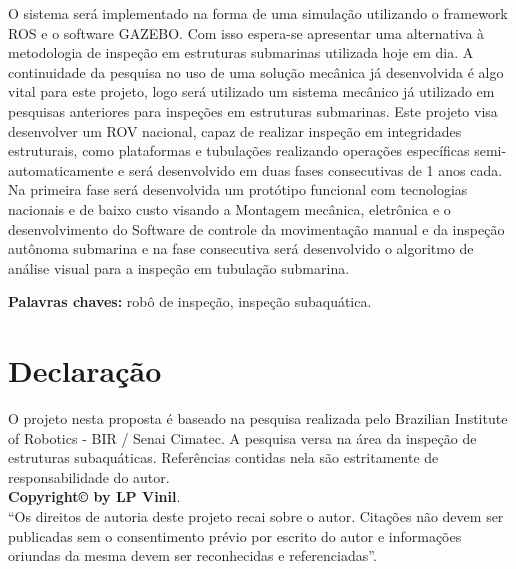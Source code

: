 O sistema será implementado na forma de uma simulação utilizando o framework ROS e o software GAZEBO. Com isso espera-se apresentar uma alternativa à metodologia de inspeção em estruturas submarinas utilizada hoje em dia. A continuidade da pesquisa no uso de uma solução mecânica já desenvolvida é algo vital para este projeto, logo será utilizado um sistema mecânico já utilizado em pesquisas anteriores para inspeções em estruturas submarinas.
Este projeto visa desenvolver um ROV nacional, capaz de realizar inspeção em integridades estruturais, como plataformas e tubulações realizando operações específicas semi-automaticamente e será desenvolvido em duas fases consecutivas de 1 anos cada. Na primeira fase será desenvolvida um protótipo funcional com tecnologias nacionais e de baixo custo visando a Montagem mecânica, eletrônica e o desenvolvimento do Software de controle da movimentação manual e da inspeção autônoma submarina e na fase consecutiva será desenvolvido o algoritmo de análise visual para a inspeção em tubulação submarina.

 

\vspace*{1cm}
\noindent \textbf{Palavras chaves: }robô de inspeção, inspeção subaquática.


\chapter*{Declaração}
O projeto nesta proposta é baseado na pesquisa realizada pelo Brazilian Institute of Robotics - BIR / Senai Cimatec. A pesquisa versa na área da inspeção de estruturas subaquáticas. Referências contidas nela são estritamente de responsabilidade do autor.\\
\vspace*{8cm}
\vfill
\noindent \textbf{Copyright\copyright{} by LP Vinil}.\\
``Os direitos de autoria deste projeto recai sobre o autor. Citações não devem ser publicadas sem o consentimento prévio por escrito do autor e informações oriundas da mesma devem ser reconhecidas e referenciadas''.



